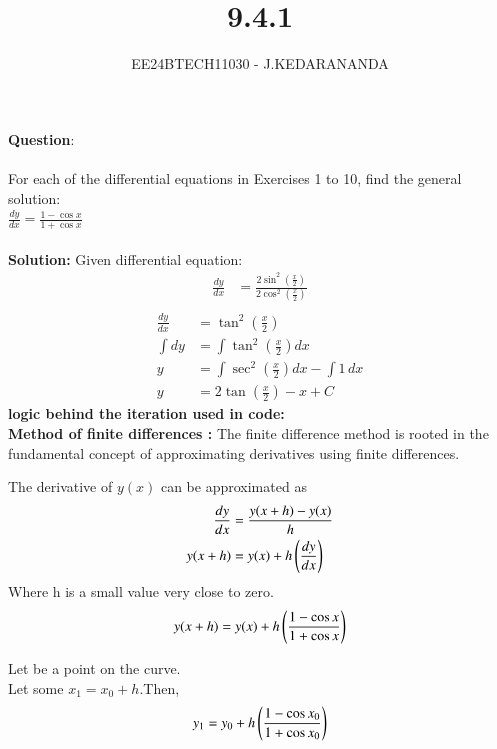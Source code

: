 \documentclass[journal]{IEEEtran}
\renewcommand{\thefigure}{\theenumi}
\renewcommand{\thetable}{\theenumi}
\numberwithin{equation}{enumi}
\numberwithin{figure}{enumi}
\renewcommand{\thetable}{\theenumi}
\begin{document}

\vspace{3cm}

\title{9.4.1}
\author{EE24BTECH11030 - J.KEDARANANDA}
{\let\newpage\relax\maketitle}
\renewcommand{\thefigure}{\theenumi}
\renewcommand{\thetable}{\theenumi}
\textbf{Question}:\\\\
For each of the differential equations in Exercises 1 to 10, find the general solution:\\
$\frac{dy}{dx}=\frac{1-\cos{x}}{1+\cos{x}}$
\\\\
\textbf{Solution: }
Given differential equation:
\begin{align}
    \frac{dy}{dx} &= \frac{2 \sin^2\left(\frac{x}{2}\right)}{2 \cos^2\left(\frac{x}{2}\right)} \\
\end{align}
\begin{align}
    \frac{dy}{dx} &= \tan^2\left(\frac{x}{2}\right) \\
    \int dy &= \int \tan^2\left(\frac{x}{2}\right) dx \\
    y &= \int \sec^2\left(\frac{x}{2}\right) dx - \int 1 \, dx \\
    y &= 2 \tan\left(\frac{x}{2}\right) - x + C
\end{align}
\textbf{logic behind the iteration used in code: }\\
\textbf{Method of finite differences :}
The finite difference method is rooted in the fundamental concept of approximating derivatives using finite differences.

The derivative of $y(x)$ can be approximated as 
\begin{align}
    \frac{dy}{dx}&=\frac{y(x+h)-y(x)}{h}\\
    y(x+h)&=y(x)+h\left(\frac{dy}{dx}\right)
\end{align}
Where h is a small value very close to zero.
\begin{align}
    y(x+h)=y(x)+h\left(\frac{1-\cos{x}}{1+\cos{x}}\right) 
\end{align}

Let  be a point on the curve.\\
Let some $x_1=x_0 +h$.Then,
\begin{align}
    y_1 = y_0+h\left(\frac{1-\cos{x_0}}{1+\cos{x_0}}\right) 
\end{align}
\end{document}
